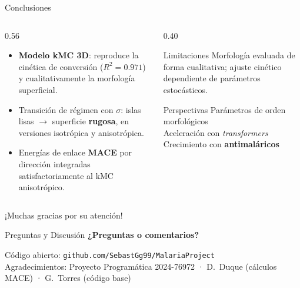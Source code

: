 \documentclass[aspectratio=169,11pt]{beamer}
\begin{document}
\begin{frame}{Conclusiones}
  \begin{columns}[T,onlytextwidth]
    \begin{column}{0.56\textwidth}
      \begin{itemize}\setlength{\itemsep}{0.6em}
        \item \textbf{Modelo kMC 3D}: reproduce la cinética de conversión ($R^2=0.971$) y cualitativamente la morfología superficial.
        \item Transición de régimen con $\sigma$: islas lisas $\to$ superficie \textbf{rugosa}, en versiones isotrópica y anisotrópica.
        \item Energías de enlace \textbf{MACE} por dirección integradas satisfactoriamente al kMC anisotrópico.
      \end{itemize}
    \end{column}
    \begin{column}{0.40\textwidth}
      \begin{block}{Limitaciones}
        \small Morfología evaluada de forma cualitativa; ajuste cinético dependiente de parámetros estocásticos.
      \end{block}
      \vspace{0.3em}
      \begin{block}{Perspectivas}
        \small
        Parámetros de orden morfológicos\\[0.15em]
        Aceleración con \textit{transformers}\\[0.15em]
        Crecimiento con \textbf{antimaláricos}
      \end{block}
    \end{column}
  \end{columns}
\end{frame}

\begin{frame}{¡Muchas gracias por su atención!}
  \vspace{0.4cm}
  \begin{center}
    \begin{minipage}{0.60\textwidth}
      \begin{block}{\centering Preguntas y Discusión}
        \centering\vspace{0.25cm}
        {\Large \textbf{¿Preguntas o comentarios?}}\\[0.25cm]
      \end{block}
    \end{minipage}
    
    \vspace{0.6cm}
    {\normalsize Código abierto: \texttt{github.com/SebastGg99/MalariaProject}}\\[0.25cm]
    {\scriptsize\color{gris}Agradecimientos: Proyecto Programática 2024-76972 · D.~Duque (cálculos MACE) · G.~Torres (código base)}
  \end{center}
\end{frame}
\end{document}
